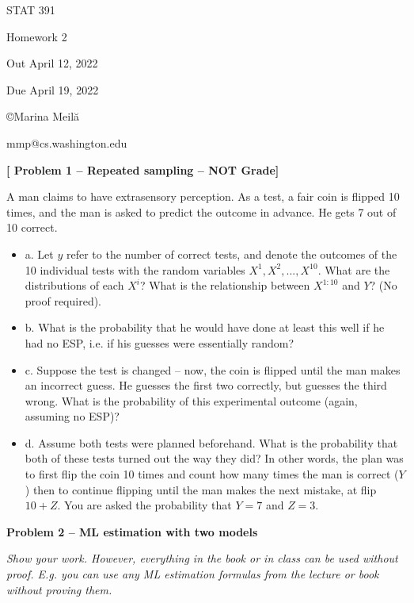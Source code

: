 \documentclass[10pt]{article}
\newcommand{\bit}{\begin{itemize}}
\newcommand{\eit}{\end{itemize}}
\begin{document}
\begin{Large}
\centerline{STAT 391} 
\centerline{Homework 2}  %
\centerline{Out April 12, 2022}      %
\centerline{Due April 19, 2022}      %
\end{Large}

\centerline{\large \copyright Marina Meil\u{a}}
\centerline{\large mmp@cs.washington.edu}

\vspace{2em}
{\bf[ Problem 1 -- Repeated sampling -- NOT Grade]}
       
A man claims to have extrasensory perception. As a test, a fair coin
is flipped 10 times, and the man is asked to predict the outcome in
advance. He gets 7 out of 10 correct. 

\bit
\item[a.]  Let $y$ refer to the number of correct tests, and
   denote the outcomes of the 10 individual tests with the random
   variables $X^1,X^2,..., X^{10}$.  What are the distributions
   of each $X^i$?  What is the relationship
   between $X^{1:10}$ and $Y$?   (No proof required).

\item[b.] What is the probability that he would have done at least
   this well if he had no ESP, i.e. if his guesses were essentially
   random?  

\item[c.] Suppose the test is changed -- now, the coin is flipped until the
   man makes an incorrect guess.  He guesses the first two correctly,
   but guesses the third wrong.  What is the probability of this
   experimental outcome (again, assuming no ESP)?

\item[d.] Assume both tests were planned beforehand.  What is the
  probability that both of these tests turned out the way they did?
  In other words, the plan was to first flip the coin 10 times and
  count how many times the man is correct ($Y$) then to continue flipping
  until the man makes the next mistake, at flip
  $10+Z$. You are asked the probability that $Y=7$ and $Z=3$. 
\eit


{\bf Problem 2 -- ML estimation with two models}

{\em Show your work. However, everything in the book or in class can be used without proof. E.g. you can use any ML estimation formulas from the lecture or book without proving them.}
\end{document}
